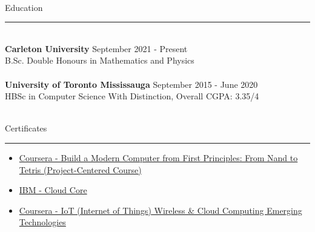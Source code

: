 \documentclass[10pt]{report}
\begin{document}
\hfill\\
\large{Education} \vspace{4pt}
\hrule
\hfill\\
\normalsize{
\textbf{Carleton University} \hfill September 2021 - Present\\
B.Sc. Double Honours in Mathematics and Physics
}\\
\hfill\\
\normalsize{
\textbf{University of Toronto Mississauga} \hfill September 2015 - June 2020\\
HBSc in Computer Science With Distinction, Overall CGPA: 3.35/4
}

\hfill\\
\large{Certificates} \vspace{4pt}
\hrule
\normalsize{
\begin{itemize}[leftmargin=*]
\vspace{4pt}
\itemsep2pt 
    \item \href{https://www.coursera.org/account/accomplishments/certificate/NLWW9AHNYSUV}{Coursera - Build a Modern Computer from First Principles: From Nand to Tetris (Project-Centered Course)
}
    \item \href{https://www.youracclaim.com/badges/2cc45d22-8c1d-433a-a97d-13e4eb51f2e0?source=linked_in_profile}{IBM - Cloud Core}
    \item \href{https://www.coursera.org/account/accomplishments/certificate/ZP4B8VT5SGVE}{Coursera - IoT (Internet of Things) Wireless \& Cloud Computing Emerging Technologies}
\end{itemize}
}
\end{document}
